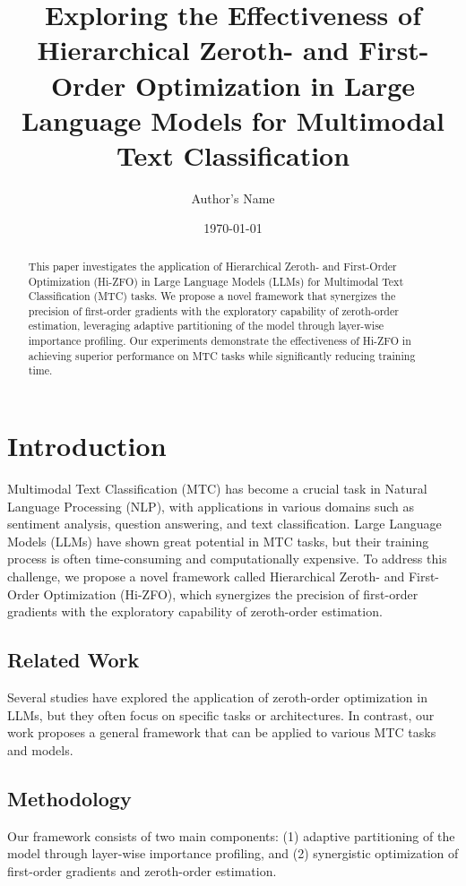\documentclass[12pt]{article}
\title{Exploring the Effectiveness of Hierarchical Zeroth- and First-Order Optimization in Large Language Models for Multimodal Text Classification}
\author{Author's Name}
\date{\today}
\begin{document}
\maketitle

\begin{abstract}
This paper investigates the application of Hierarchical Zeroth- and First-Order Optimization (Hi-ZFO) in Large Language Models (LLMs) for Multimodal Text Classification (MTC) tasks. We propose a novel framework that synergizes the precision of first-order gradients with the exploratory capability of zeroth-order estimation, leveraging adaptive partitioning of the model through layer-wise importance profiling. Our experiments demonstrate the effectiveness of Hi-ZFO in achieving superior performance on MTC tasks while significantly reducing training time.
\end{abstract}

\section{Introduction}

Multimodal Text Classification (MTC) has become a crucial task in Natural Language Processing (NLP), with applications in various domains such as sentiment analysis, question answering, and text classification. Large Language Models (LLMs) have shown great potential in MTC tasks, but their training process is often time-consuming and computationally expensive. To address this challenge, we propose a novel framework called Hierarchical Zeroth- and First-Order Optimization (Hi-ZFO), which synergizes the precision of first-order gradients with the exploratory capability of zeroth-order estimation.

\subsection{Related Work}

Several studies have explored the application of zeroth-order optimization in LLMs, but they often focus on specific tasks or architectures. In contrast, our work proposes a general framework that can be applied to various MTC tasks and models.

\subsection{Methodology}

Our framework consists of two main components: (1) adaptive partitioning of the model through layer-wise importance profiling, and (2) synergistic optimization of first-order gradients and zeroth-order estimation.
\end{document}
